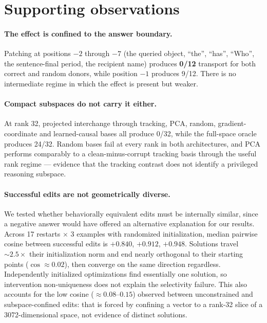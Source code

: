 \documentclass[11pt]{article}
\begin{document}
\section{Supporting observations}
\label{sec:appendix-supporting}

\paragraph{The effect is confined to the answer boundary.}
Patching at positions $-2$ through $-7$ (the queried object, \enquote{the},
\enquote{has}, \enquote{Who}, the sentence-final period, the recipient name)
produces \textbf{0/12} transport for both correct and random donors, while
position $-1$ produces 9/12. There is no intermediate regime in which the
effect is present but weaker.

\paragraph{Compact subspaces do not carry it either.}
At rank 32, projected interchange through tracking, PCA, random,
gradient-coordinate and learned-causal bases all produce 0/32, while the
full-space oracle produces 24/32. Random bases fail at every rank in both
architectures, and PCA performs comparably to a clean-minus-corrupt tracking
basis through the useful rank regime --- evidence that the tracking contrast
does not identify a privileged reasoning subspace.

\paragraph{Successful edits are not geometrically diverse.}
We tested whether behaviorally equivalent edits must be internally similar,
since a negative answer would have offered an alternative explanation for our
results. Across 17 restarts $\times$ 3 examples with randomized
initialization, median pairwise cosine between successful edits is $+0.840$,
$+0.912$, $+0.948$. Solutions travel ${\sim}2.5\times$ their initialization
norm and end nearly orthogonal to their starting points ($\cos \approx 0.02$),
then converge on the same direction regardless. Independently initialized
optimizations find essentially one solution, so intervention non-uniqueness
does not explain the selectivity failure. This also accounts for the low
cosine ($\approx 0.08$--$0.15$) observed between unconstrained and
subspace-confined edits: that is forced by confining a vector to a rank-32
slice of a 3072-dimensional space, not evidence of distinct solutions.
\end{document}
